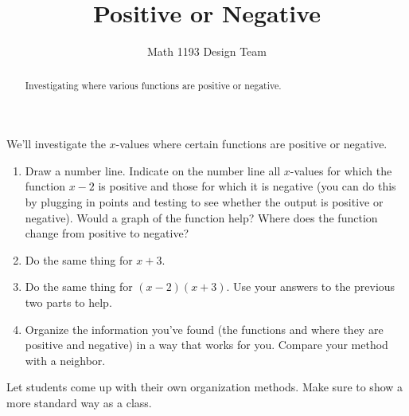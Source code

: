 \documentclass[noauthor]{ximera}
\title{Positive or Negative}
\author{Math 1193 Design Team}
\begin{document}
\begin{abstract}
    Investigating where various functions are positive or negative.
\end{abstract}
\maketitle

We'll investigate the \(x\)-values where certain functions are positive or negative.

\begin{enumerate}
    \item Draw a number line. Indicate on the number line all \(x\)-values
    for which the function \(x - 2\) is positive and those for which
    it is negative (you can do this by plugging in points and testing
    to see whether the output is positive or negative). Would a graph 
    of the function help? 
    Where does the function change from positive to negative?
    \item Do the same thing for \(x + 3\).
    \item Do the same thing for \((x - 2)(x + 3)\). Use your answers to
    the previous two parts to help.
    \item Organize the information you've found (the functions and where they
    are positive and negative) in a way that works for
    you. Compare your method with a neighbor.
\end{enumerate}

\begin{instructorNotes}
Let students come up with their own organization methods. Make sure to show
a more standard way as a class.
\end{instructorNotes}
\end{document}
